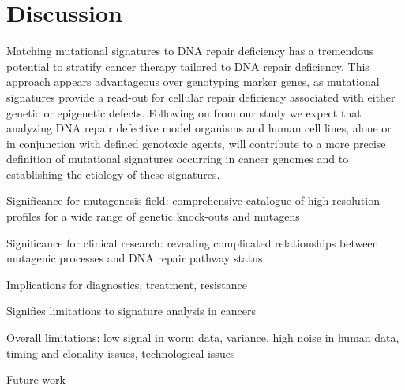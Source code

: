 


\pagestyle{empty}
\chapter{Discussion}


Matching mutational signatures to DNA repair deficiency has a tremendous potential to stratify cancer therapy tailored to DNA repair deficiency. This approach appears advantageous over genotyping marker genes, as mutational signatures provide a read-out for cellular repair deficiency associated with either genetic or epigenetic defects. Following on from our study we expect that analyzing DNA repair defective model organisms and human cell lines, alone or in conjunction with defined genotoxic agents, will contribute to a more precise definition of mutational signatures occurring in cancer genomes and to establishing the etiology of these signatures.



Significance for mutagenesis field: comprehensive catalogue of high-resolution profiles for a wide range of genetic knock-outs and mutagens

Significance for clinical research: revealing complicated relationships between mutagenic processes and DNA repair pathway status

Implications for diagnostics, treatment, resistance

Signifies limitations to signature analysis in cancers

Overall limitations: low signal in worm data, variance, high noise in human data, timing and clonality issues, technological issues

Future work


